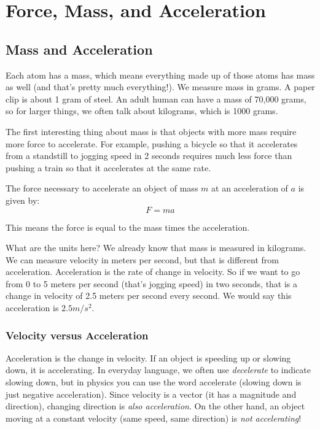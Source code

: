 \chapter{Force, Mass, and Acceleration}

\section{Mass and Acceleration}

Each atom has a mass, which means everything made up of those atoms has mass as 
well (and that's pretty much everything!). We measure mass in grams. A paper clip 
is about 1 gram of steel. An adult human can have a mass of 70,000 grams, so for 
larger things, we often talk about kilograms, which is 1000 grams.

The first interesting thing about mass is that objects with more mass
require more force to accelerate. For example, pushing a bicycle so
that it accelerates from a standstill to jogging speed in 2 seconds
requires much less force than pushing a train so that it accelerates
at the same rate.


\begin{mdframed}[style=important, frametitle={Newton's Second Law of Motion}]

The force necessary to accelerate an object of mass $m$ at an acceleration of
$a$ is given by:
$$F = m a$$

This means the force is equal to the mass times the acceleration.

\end{mdframed}

What are the units here? We already know that mass is measured in
kilograms. We can measure velocity in meters per second, but that is
different from acceleration. Acceleration is the rate of change in
velocity. So if we want to go from 0 to 5 meters per second (that's
jogging speed) in two seconds, that is a change in velocity of 2.5
meters per second every second. We would say this acceleration is $2.5
m/s^2$.

\subsection{Velocity versus Acceleration}
Acceleration is the change in velocity. If an object is speeding up or slowing 
down, it is accelerating. In everyday language, we often use \textit{decelerate} 
to indicate slowing down, but in physics you can use the word accelerate (slowing 
down is just negative acceleration). Since velocity is a vector (it has a 
magnitude and direction), changing direction is \textit{also acceleration}. On 
the other hand, an object moving at a constant velocity (same speed, same 
direction) is \textit{not accelerating}!

